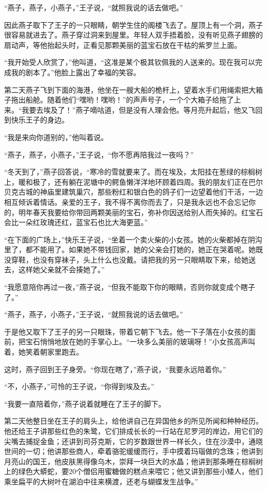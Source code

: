 \documentclass[12pt,UTF-8,openany]{ctexbook}
\begin{document}
\begin{normalsize}
    “燕子，燕子，小燕子，”王子说，“就照我说的话去做吧。”
    
    因此燕子取下了王子的一只眼睛，朝学生住的阁楼飞去了。屋顶上有一个洞，燕子很容易就进去了。燕子穿过洞来到屋里。年轻人双手捂着脸，没有听见燕子翅膀的扇动声，等他抬起头时，正看见那颗美丽的蓝宝石放在干枯的紫罗兰上面。
    
    “我开始受人欣赏了，”他叫道，“这准是某个极其钦佩我的人送来的。现在我可以完成我的剧本了。”他脸上露出了幸福的笑容。
    
    第二天燕子飞到下面的海港，他坐在一艘大船的桅杆上，望着水手们用绳索把大箱子拖出船舱。随着他们“嘿哟！嘿哟！”的声声号子，一个个大箱子给拖了上来。“我要去埃及了！”燕子嘀咕道，但是没有人理会他。等月亮升起后，他又飞回到快乐王子的身边。
    
    “我是来向你道别的，”他叫着说。
    
    “燕子，燕子，小燕子，”王子说，“你不愿再陪我过一夜吗？”
    
    “冬天到了，”燕子回答说，“寒冷的雪就要来了。而在埃及，太阳挂在葱绿的棕榈树上，暖和极了，还有躺在泥塘中的鳄鱼懒洋洋地环顾着四周。我的朋友们正在巴尔贝克古城的神庙里建筑巢穴，那些粉红和银白色的鸽子们一边望着他们干活，一边相互倾诉着情话。亲爱的王子，我不得不离你而去了，只是我永远也不会忘记你的，明年春天我要给你带回两颗美丽的宝石，弥补你因送给别人而失掉的。红宝石会比一朵红玫瑰还红，蓝宝石也比大海更蓝。”
    
    “在下面的广场上，”快乐王子说，“坐着一个卖火柴的小女孩。她的火柴都掉在阴沟里了，都不能用了。如果她不带钱回家，她的父亲会打她的，她正在哭着呢。她既没穿鞋，也没有穿袜子，头上什么也没戴。请把我的另一只眼睛取下来，给她送去，这样她父亲就不会揍她了。”
    
    “我愿意陪你再过一夜，”燕子说，“但我不能取下你的眼睛，否则你就变成个瞎子了。”
    
    “燕子，燕子，小燕子，”王子说，“就照我说的话去做吧。”
    
    于是他又取下了王子的另一只眼珠，带着它朝下飞去。他一下子落在小女孩的面前，把宝石悄悄地放在她的手掌心上。“一块多么美丽的玻璃呀！”小女孩高声叫着，她笑着朝家里跑去。
    
    这时，燕子回到王子身旁。“你现在瞎了，”燕子说，“我要永远陪着你。”
    
    “不，小燕子，”可怜的王子说，“你得到埃及去。”
    
    “我要一直陪着你，”燕子说着就睡在了王子的脚下。
    
    第二天他整日坐在王子的肩头上，给他讲自己在异国他乡的所见所闻和种种经历。他还给王子讲那些红色的朱鹭，它们排成长长的一行站在尼罗河的岸边，用它们的尖嘴去捕捉金鱼；还讲到司芬克斯，它的岁数跟世界一样长久，住在沙漠中，通晓世间的一切；他讲那些商人，牵着骆驼缓缓而行，手中摸着玛瑙做的念珠；他讲到月亮山的国王，他皮肤黑得像乌木，崇拜一块巨大的水晶；他讲到那条睡在棕榈树上的绿色大蟒蛇，要20个僧侣用蜜糖做的糕点来喂它；他又讲到那些小矮人，他们乘坐扁平的大树叶在湖泊中往来横渡，还老与蝴蝶发生战争。”
    

\end{normalsize}
\end{document}
